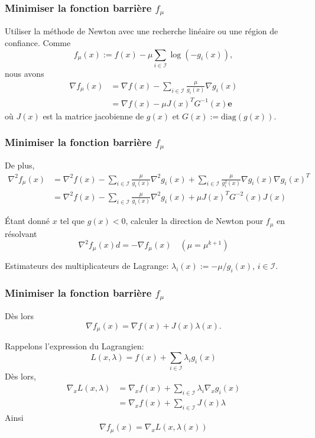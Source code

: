 \documentclass[usepdftitle=false]{beamer}
\def\cI{\mathcal{I}}
\def\be{\boldsymbol{e}}
\begin{document}
\begin{frame}
\frametitle{Minimiser la fonction barrière $f_{\mu}$}

Utiliser la méthode de Newton avec une recherche linéaire ou une région de confiance.
Comme
$$
f_{\mu}(x) := f(x) - \mu \sum_{i \in \cI} \log (-g_i(x)),
$$
nous avons
\begin{align*}
\nabla f_{\mu}(x) &= \nabla f(x) - \sum_{i \in \cI} \frac{\mu}{g_i(x)} \nabla g_i(x) \\
&= \nabla f(x) - \mu J(x)^T G^{-1}(x) \be
\end{align*}
où $J(x)$ est la matrice jacobienne de $g(x)$ et $G(x) := \mbox{diag}(g(x))$.

\end{frame}

\begin{frame}
\frametitle{Minimiser la fonction barrière $f_{\mu}$}

De plus,
\begin{align*}
\nabla^2 f_{\mu}(x) &= \nabla^2 f(x) - \sum_{i \in \cI} \frac{\mu}{g_i(x)} \nabla^2 g_i(x) + \sum_{i \in \cI} \frac{\mu}{g^2_i(x)} \nabla g_i(x) \nabla g_i(x)^T \\
&= \nabla^2 f(x) - \sum_{i \in \cI} \frac{\mu}{g_i(x)} \nabla^2 g_i(x) + \mu J(x)^T G^{-2}(x)J(x)
\end{align*}

Étant donné $x$ tel que $g(x) < 0$, calculer la direction de Newton pour $f_{\mu}$ en résolvant
$$
\nabla^2 f_{\mu}(x) d = -\nabla f_{\mu}(x)\quad (\mu = \mu^{k+1})
$$

\mbox{}

Estimateurs des multiplicateurs de Lagrange: $\lambda_i (x) := - \mu/g_i(x)$, $i \in \cI$.

\end{frame}

\begin{frame}
\frametitle{Minimiser la fonction barrière $f_{\mu}$}

Dès lors
$$
\nabla f_{\mu}(x) = \nabla f(x) + J(x) \lambda(x).
$$

\mbox{}

Rappelons l'expression du Lagrangien:
$$
L(x,\lambda) = f(x)+\sum_{i \in \cI} \lambda_i g_i(x)
$$
Dès lors,
\begin{align*}
\nabla_x L(x,\lambda)
& = \nabla_x f(x)+\sum_{i \in \cI} \lambda_i \nabla_x g_i(x) \\
& = \nabla_x f(x)+\sum_{i \in \cI} J(x)\lambda
\end{align*}
Ainsi
$$
\nabla f_{\mu}(x) = \nabla_x L(x,\lambda(x))
$$

\end{frame}
\end{document}
